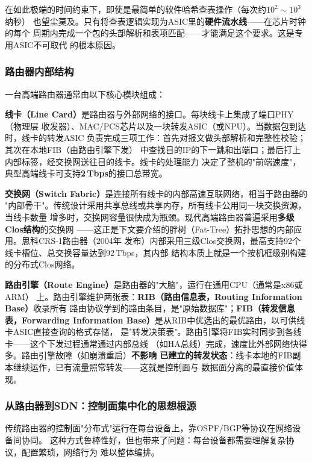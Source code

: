 在如此极端的时间约束下，即使是最简单的软件哈希查表操作（每次约\(10^2 \sim 10^3\)纳秒）
也望尘莫及。只有将查表逻辑实现为ASIC里的\textbf{硬件流水线}——在芯片时钟的每个
周期内完成一个包的头部解析和表项匹配——才能满足这个要求。这是专用ASIC不可取代
的根本原因。

\subsubsection{路由器内部结构}

一台高端路由器通常由以下核心模块组成：

\textbf{线卡（Line Card）}是路由器与外部网络的接口。每块线卡上集成了端口PHY（物理层
收发器）、MAC/PCS芯片以及一块转发ASIC（或NPU）。当数据包到达时，线卡的转发ASIC
负责完成三项工作：首先对报文做头部解析和完整性校验；其次在本地FIB（由路由引擎下发）
中查找目的IP的下一跳和出端口；最后打上内部标签，经交换网送往目的线卡。线卡的处理能力
决定了整机的"前端速度"，典型高端线卡可支持\textbf{2\,Tbps}的接口总带宽。

\textbf{交换网（Switch Fabric）}是连接所有线卡的内部高速互联网络，相当于路由器的
"内部骨干"。传统设计采用共享总线或共享内存，所有线卡公用同一块交换资源，当线卡数量
增多时，交换网容量很快成为瓶颈。现代高端路由器普遍采用\textbf{多级Clos结构}的交换网
——这正是下文要介绍的胖树（Fat-Tree）拓扑思想的内部应用。思科CRS-1路由器（2004年
发布）内部采用三级Clos交换网，最高支持92个线卡槽位、总交换容量达到92\,Tbps，其内部
结构本质上就是一个按机框级别构建的分布式Clos网络。

\textbf{路由引擎（Route Engine）}是路由器的"大脑"，运行在通用CPU（通常是x86或ARM）
上。路由引擎维护两张表：\textbf{RIB（路由信息表，Routing Information Base）}收录所有
路由协议学到的路由条目，是"原始数据库"；\textbf{FIB（转发信息表，Forwarding
Information Base）}是从RIB中优选出的最优路由，以可供线卡ASIC直接查询的格式存储，
是"转发决策表"。路由引擎将FIB实时同步到各线卡——这个下发过程通常通过内部总线
（如HA总线）完成，速度比外部网络快得多。路由引擎故障（如崩溃重启）\textbf{不影响
已建立的转发状态}：线卡本地的FIB副本继续运作，已有流量照常转发——这就是控制面与
数据面分离的最直接价值体现。

\subsubsection{从路由器到SDN：控制面集中化的思想根源}

传统路由器的控制面"分布式"运行在每台设备上，靠OSPF/BGP等协议在网络设备间协同。
这种方式鲁棒性好，但也带来了问题：每台设备都需要理解复杂协议，配置繁琐，网络行为
难以整体编排。

